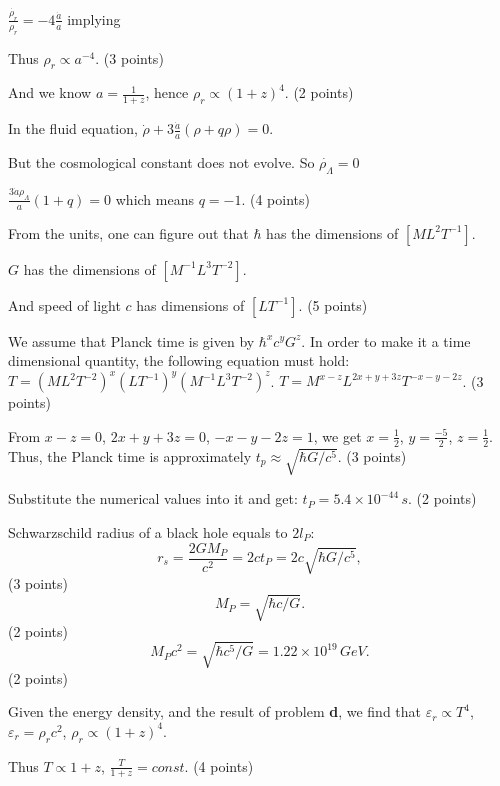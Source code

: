 \begin{description}
  $\frac{\dot{\rho_r}}{\rho_r} = -4\frac{\dot{a}}{a}$ implying

  Thus $\rho_r \propto a^{-4}$. \hfill(3 points)

  And we know $a = \frac{1}{1+z}$, hence $\rho_r \propto (1+z)^4$.
  \hfill(2 points)

\item[(e)] In the fluid equation,
  $\dot{\rho} + 3\frac{\dot{a}}{a}(\rho + q\rho) = 0$.

  But the cosmological constant does not evolve. So
  $\dot{\rho_\Lambda} = 0$

  $\frac{3\dot{a}\rho_\Lambda}{a}(1 + q) = 0$ which means $q = -1$.
  \hfill(4 points)

\item[(f)] From the units, one can figure out that $\hbar$ has the
  dimensions of $[ML^2T^{-1}]$.

  $G$ has the dimensions of $[M^{-1}L^3T^{-2}]$.

  And speed of light $c$ has dimensions of $[LT^{-1}]$. \hfill(5 points)

  We assume that Planck time is given by $\hbar^x c^y G^z$. In order to
  make it a time dimensional quantity, the following equation must hold:
  $T = (ML^2T^{-2})^x(LT^{-1})^y(M^{-1}L^3T^{-2})^z$.
  $T = M^{x-z}L^{2x+y+3z}T^{-x-y-2z}$. \hfill(3 points)

  From $x - z = 0$, $2x + y + 3z = 0$, $-x - y - 2z = 1$, we get
  $x = \frac{1}{2}$, $y = \frac{-5}{2}$, $z = \frac{1}{2}$. Thus, the
  Planck time is approximately $t_p \approx \sqrt{\hbar G/c^5}$.
  \hfill(3 points)

  Substitute the numerical values into it and get:
  $t_P = 5.4\times 10^{-44}\,s$. \hfill(2 points)

\item[(g)] Schwarzschild radius of a black hole equals to $2l_P$:
  \[ r_s = \frac{2GM_P}{c^2} = 2ct_P = 2c\sqrt{\hbar G/c^5}, \]
  \hfill(3 points)
  \[ M_P = \sqrt{\hbar c/G}. \]
  \hfill(2 points)
  \[ M_P c^2 = \sqrt{\hbar c^5/G} = 1.22\times 10^{19}\,GeV. \]
  \hfill(2 points)

\item[(h)] Given the energy density, and the result of problem \textbf{d},
  we find that $\varepsilon_r \propto T^4$,
  $\varepsilon_r = \rho_r c^2$, $\rho_r \propto (1+z)^4$.

  Thus $T \propto 1 + z$, $\frac{T}{1+z} = const$. \hfill(4 points)


\end{description}
